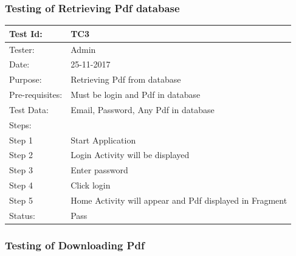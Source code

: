 \subsubsection{Testing of Retrieving Pdf database} 	

 \begin{center}
\begin{tabular}{ | m{5em} | m{5cm}|} 
\hline
Test Id: & TC3   \\ 
\hline
Tester: & Admin  \\ 
\hline
Date: & 25-11-2017  \\ 
\hline
Purpose: & Retrieving Pdf from database   \\ 
\hline
Pre-requisites: & Must be login and Pdf in database  \\ 
\hline
Test Data: & Email, Password, Any Pdf in database   \\ 
\hline
Steps: &  \\
\hline  
Step 1 &  Start Application \\ 
Step 2 &  Login Activity will be displayed  \\ 
Step 3 &  Enter password  \\ 
Step 4 &  Click login  \\ 
Step 5 &  Home Activity will appear and Pdf displayed in Fragment  \\ 
\hline
Status: & Pass   \\ 
\hline
\end{tabular}
\end{center}


\subsubsection{Testing of Downloading Pdf} 	


